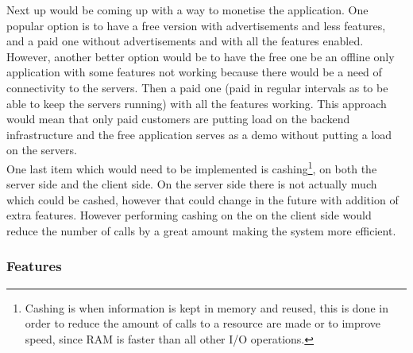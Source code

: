 \documentclass{article}
\newcommand{\vspaceconst}{-2ex}
\begin{document}
\begin{multicols}{2}
Next up would be coming up with a way to monetise the application. One popular option is to have a free version with advertisements and less features, and a paid one without advertisements and with all the features enabled. However, another better option would be to have the free one be an offline only application with some features not working because there would be a need of connectivity to the servers. Then a paid one (paid in regular intervals as to be able to keep the servers running) with all the features working. This approach would mean that only paid customers are putting load on the backend infrastructure and the free application serves as a demo without putting a load on the servers.\\
One last item which would need to be implemented is cashing\footnote{Cashing is when information is kept in memory and reused, this is done in order to reduce the amount of calls to a resource are made or to improve speed, since RAM is faster than all other I/O operations.}, on both the server side and the client side. On the server side there is not actually much which could be cashed, however that could change in the future with addition of extra features. However performing cashing on the on the client side would reduce the number of calls by a great amount making the system more efficient.\\


\subsubsection{Features}
\vspace{\vspaceconst}


\end{multicols}
\end{document}
